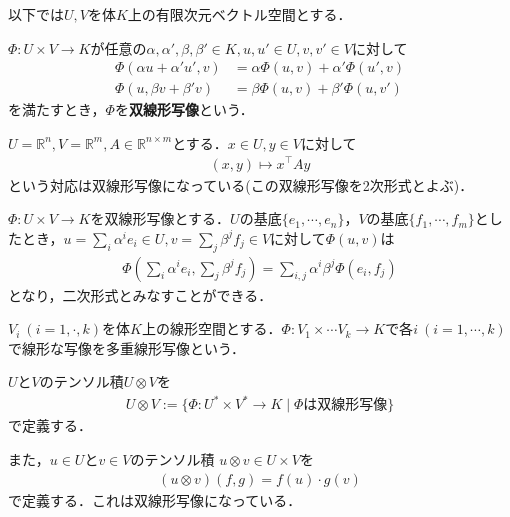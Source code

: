 \documentclass[uplatex]{jsarticle}
\begin{document}
以下では$U,V$を体$K$上の有限次元ベクトル空間とする．
\begin{teigi}[双線形写像]
  $\Phi\colon U\times V\to K$が任意の$\alpha,\alpha',\beta,\beta'\in K,u,u'\in U ,v,v'\in V$に対して
  \begin{align*}
    \Phi(\alpha u + \alpha' u',v) & = \alpha \Phi(u,v) + \alpha' \Phi(u',v) \\
    \Phi(u,\beta v + \beta' v) & = \beta \Phi(u,v) + \beta' \Phi(u,v') 
  \end{align*}
  を満たすとき，$\Phi$を\textbf{双線形写像}という．
\end{teigi}

\begin{rei}
  $U = \mathbb{R}^n , V = \mathbb{R}^m, A \in \mathbb{R}^{n\times m}$とする．$x \in U , y \in V$に対して
  \begin{align*}
    (x,y) \mapsto x^\top A y
  \end{align*}
  という対応は双線形写像になっている(この双線形写像を2次形式とよぶ)．
\end{rei}
\begin{remark}
  $\Phi\colon U\times V\to K$を双線形写像とする．$U$の基底$\{e_1,\cdots,e_n\}$，$V$の基底$\{f_1,\cdots,f_m\}$としたとき，$u = \sum_{i} \alpha^i e_i \in U , v = \sum_j \beta^j  f_j \in V$に対して$\Phi(u,v)$は
  \begin{align*}
    \Phi\left(\sum_{i} \alpha^i e_i,\sum_j \beta^j f_j\right) = \sum_{i,j} \alpha^i \beta^j \Phi(e_i,f_j)
  \end{align*}
  となり，二次形式とみなすことができる．
\end{remark}
\begin{teigi}[多重線形写像]
  $V_i\ (i=1,\cdot,k)$を体$K$上の線形空間とする．$\Phi\colon V_1\times \cdots V_k \to K$で各$i\  ( i=1,\cdots,k)$で線形な写像を多重線形写像という．
\end{teigi}
\begin{teigi}[テンソル積]
  $U$と$V$のテンソル積$U\otimes V$を
  \begin{align*}
    U\otimes V := \{ \Phi \colon U^\ast \times V^\ast \to K \mid \Phi\mbox{は双線形写像} \}
  \end{align*}
  で定義する．

  また，$u\in U$と$v\in V$のテンソル積 $u\otimes v\in U\times V$を
  \begin{align*}
    (u\otimes v)(f,g) = f(u)\cdot g(v)
  \end{align*}
  で定義する．これは双線形写像になっている．
\end{teigi}
\end{document}
